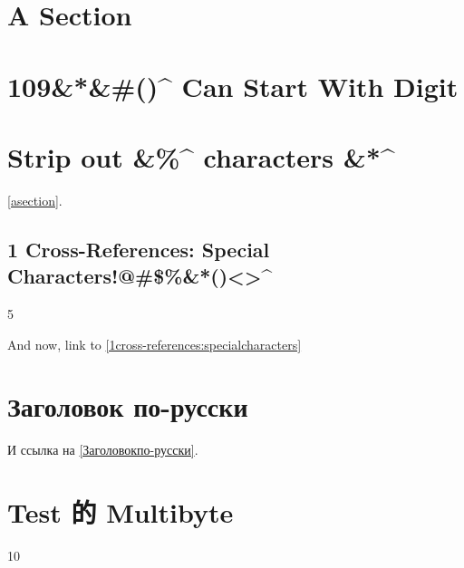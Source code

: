 
\def\mytitle{Cross-References}


\part{A Section }
\label{asection}

\part{109\&*\&\#()\^{} Can Start With Digit }
\label{109canstartwithdigit}

\part{Strip out \&\%\^{} characters \&*\^{} }
\label{stripoutcharacters}

\autoref{asection}.

\chapter{1 Cross-References: Special Characters!@\#\$\%\&*()<>\^{} }
\label{1cross-references:specialcharacters}

5

And now, link to \autoref{1cross-references:specialcharacters}

\part{Заголовок по-русски }
\label{Заголовокпо-русски}

И ссылка на \autoref{Заголовокпо-русски}.

\part{Test 的 Multibyte }
\label{test的multibyte}

10




